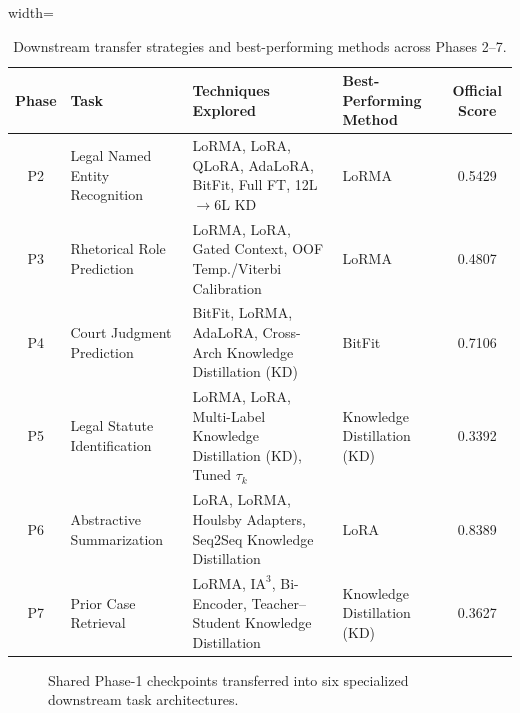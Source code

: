 \documentclass[11pt, oneside]{article}
\begin{document}
\begin{table}[t]
\centering
\scriptsize
\setlength{\tabcolsep}{3.5pt}
\renewcommand{\arraystretch}{0.85}
\caption{Downstream transfer strategies and best-performing methods across Phases 2--7.}
\label{tab:transfer_protocol}
\begin{adjustbox}{width=\textwidth}
\begin{tabular}{@{}clllc@{}}
\toprule
\textbf{Phase} & \textbf{Task} & \textbf{Techniques Explored} & \textbf{Best-Performing Method} & \textbf{Official Score} \\
\midrule
P2 & Legal Named Entity Recognition & LoRMA, LoRA, QLoRA, AdaLoRA, BitFit, Full FT, 12L$\to$6L KD & LoRMA & 0.5429 \\
P3 & Rhetorical Role Prediction & LoRMA, LoRA, Gated Context, OOF Temp./Viterbi Calibration & LoRMA & 0.4807 \\
P4 & Court Judgment Prediction & BitFit, LoRMA, AdaLoRA, Cross-Arch Knowledge Distillation (KD) & BitFit & 0.7106 \\
P5 & Legal Statute Identification & LoRMA, LoRA, Multi-Label Knowledge Distillation (KD), Tuned $\tau_k$ & Knowledge Distillation (KD) & 0.3392 \\
P6 & Abstractive Summarization & LoRA, LoRMA, Houlsby Adapters, Seq2Seq Knowledge Distillation & LoRA & 0.8389 \\
P7 & Prior Case Retrieval & LoRMA, $\text{IA}^3$, Bi-Encoder, Teacher--Student Knowledge Distillation & Knowledge Distillation (KD) & 0.3627 \\
\bottomrule
\end{tabular}
\end{adjustbox}
\end{table}

\begin{figure}[t]
\centering
\scriptsize
{}
\caption{Shared Phase-1 checkpoints transferred into six specialized downstream task architectures.}
\label{fig:transfer_architecture}
\end{figure}
\end{document}
